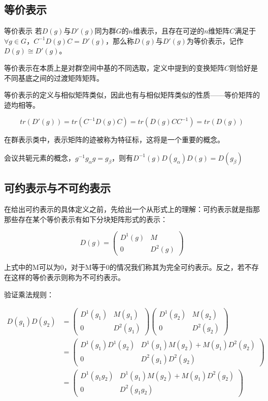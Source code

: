 
\begin{issues}
\issueDraft
\issueMissDepend
\end{issues}

\subsection{等价表示}
\begin{definition}{等价表示}
若$D(g)$与$D'(g)$同为群$G$的$n$维表示，且存在可逆的$n$维矩阵$C$满足于$\forall g\in G$，$C^{-1}D(g)C=D'(g)$，那么称$D(g)$与$D'(g)$为等价表示，记作$D(g)\cong D'(g)$。
\end{definition}

等价表示在本质上是对群空间中基的不同选取，定义中提到的变换矩阵$C$则恰好是不同基底之间的过渡矩阵矩阵。

等价表示的定义与相似矩阵类似，因此也有与相似矩阵类似的性质——等价矩阵的迹均相等。

$$tr(D'(g))=tr(C^{-1}D(g)C)=tr(D(g)CC^{-1})=tr(D(g))$$

在群表示类中，表示矩阵的迹被称为特征标，这将是一个重要的概念。

会议共轭元素的概念，$g^{-1}g_\alpha g=g_\beta$，则有$D^{-1}(g)D(g_\alpha)D(g)=D(g_\beta)$

\subsection{可约表示与不可约表示}

在给出可约表示的具体定义之前，先给出一个从形式上的理解：可约表示就是指那那些存在某个等价表示有如下分块矩阵形式的表示：

\begin{equation}
D(g)=\begin{pmatrix}
 D^1(g) & M\\
 0 & D^2(g)
\end{pmatrix}
\end{equation}

上式中的M可以为0，对于M等于0的情况我们称其为完全可约表示。反之，若不存在这样的等价表示则称为不可约表示。

验证乘法规则：

\begin{align}
D(g_1)D(g_2)&=
\begin{pmatrix}
 D^1(g_1) & M(g_1)\\
 0 & D^2(g_1)
\end{pmatrix}
\begin{pmatrix}
 D^1(g_2) & M(g_2)\\
 0 & D^2(g_2)
\end{pmatrix} \\
&=\begin{pmatrix}
 D^1(g_1)D^1(g_2) & D^1(g_1)M(g_2)+M(g_1)D^2(g_2)\\
 0 & D^2(g_1)D^2(g_2)
\end{pmatrix} \\
&=\begin{pmatrix}
 D^1(g_1g_2) & D^1(g_1)M(g_2)+M(g_1)D^2(g_2)\\
 0 & D^2(g_1g_2)
\end{pmatrix}
\end{align}

